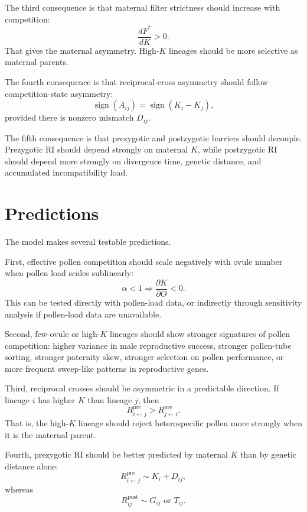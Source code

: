 \documentclass[11pt]{article}
\newcommand{\Rpre}{R^{\mathrm{pre}}}
\newcommand{\Rpost}{R^{\mathrm{post}}}
\begin{document}
The third consequence is that maternal filter strictness should increase with competition:
\begin{equation}
\frac{dF^*}{dK}>0.
\end{equation}
That gives the maternal asymmetry. High-\(K\) lineages should be more selective as maternal parents.

The fourth consequence is that reciprocal-cross asymmetry should follow competition-state asymmetry:
\begin{equation}
\operatorname{sign}(A_{ij})=\operatorname{sign}(K_i-K_j),
\end{equation}
provided there is nonzero mismatch \(D_{ij}\).

The fifth consequence is that prezygotic and postzygotic barriers should decouple. Prezygotic RI should depend strongly on maternal \(K\), while postzygotic RI should depend more strongly on divergence time, genetic distance, and accumulated incompatibility load.

\section{Predictions}

The model makes several testable predictions.

First, effective pollen competition should scale negatively with ovule number when pollen load scales sublinearly:
\begin{equation}
\alpha<1 \Rightarrow \frac{\partial K}{\partial O}<0.
\end{equation}
This can be tested directly with pollen-load data, or indirectly through sensitivity analysis if pollen-load data are unavailable.

Second, few-ovule or high-\(K\) lineages should show stronger signatures of pollen competition: higher variance in male reproductive success, stronger pollen-tube sorting, stronger paternity skew, stronger selection on pollen performance, or more frequent sweep-like patterns in reproductive genes.

Third, reciprocal crosses should be asymmetric in a predictable direction. If lineage \(i\) has higher \(K\) than lineage \(j\), then
\begin{equation}
\Rpre_{i\leftarrow j}>\Rpre_{j\leftarrow i}.
\end{equation}
That is, the high-\(K\) lineage should reject heterospecific pollen more strongly when it is the maternal parent.

Fourth, prezygotic RI should be better predicted by maternal \(K\) than by genetic distance alone:
\begin{equation}
\Rpre_{i\leftarrow j}\sim K_i + D_{ij},
\end{equation}
whereas
\begin{equation}
\Rpost_{ij}\sim G_{ij} \text{ or } T_{ij}.
\end{equation}
\end{document}

